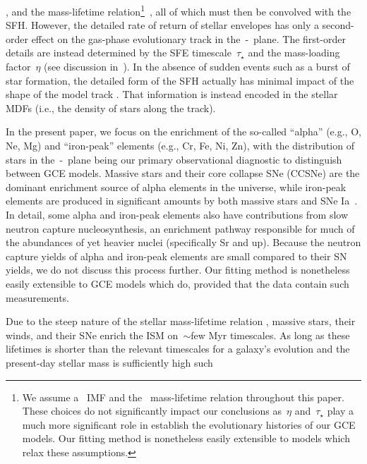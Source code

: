 \documentclass[foo.tex]{subfiles}
\begin{document}
\citep[e.g.,][]{Kalirai2008}, and the mass-lifetime relation\footnote{
	We assume a~\citet{Kroupa2001} IMF and the~\citet{Larson1974} mass-lifetime
	relation throughout this paper.
	These choices do not significantly impact our conclusions as~$\eta$
	and~$\tau_\star$ play a much more significant role in establish the
	evolutionary histories of our GCE models.
	Our fitting method is nonetheless easily extensible to models which relax
	these assumptions.
}~\citep*[e.g.,][]{Larson1974, Maeder1989, Hurley2000}, all of which must then
be convolved with the SFH.
However, the detailed rate of return of stellar envelopes has only a
second-order effect on the gas-phase evolutionary track in the~\afe-\feh~plane.
The first-order details are instead determined by the SFE timescale~$\tau_\star$
and the mass-loading factor~$\eta$ (see discussion in~\citealt{Weinberg2017}).
In the absence of sudden events such as a burst of star formation, the detailed
form of the SFH actually has minimal impact of the shape of the model track
\citep{Weinberg2017, Johnson2020}.
That information is instead encoded in the stellar MDFs (i.e., the density of
stars along the track).
\par
In the present paper, we focus on the enrichment of the so-called ``alpha''
(e.g., O, Ne, Mg) and ``iron-peak'' elements (e.g., Cr, Fe, Ni, Zn), with the
distribution of stars in the~\afe-\feh~plane being our primary observational
diagnostic to distinguish between GCE models.
Massive stars and their core collapse SNe (CCSNe) are the dominant enrichment
source of alpha elements in the universe, while iron-peak elements are produced
in significant amounts by both massive stars and SNe Ia~\citep[e.g.,][]{Johnson2019}.
In detail, some alpha and iron-peak elements also have contributions from slow
neutron capture nucleosynthesis, an enrichment pathway responsible for much of
the abundances of yet heavier nuclei (specifically Sr and up).
Because the neutron capture yields of alpha and iron-peak elements are
small compared to their SN yields, we do not discuss this process further.
Our fitting method is nonetheless easily extensible to GCE models which do,
provided that the data contain such measurements.
\par
Due to the steep nature of the stellar mass-lifetime relation
\citep[e.g.,][]{Larson1974, Maeder1989, Hurley2000}, massive stars, their winds,
and their SNe enrich the ISM on~$\sim$few Myr timescales.
As long as these lifetimes is shorter than the relevant timescales for a
galaxy's evolution and the present-day stellar mass is sufficiently high such
\end{document}
